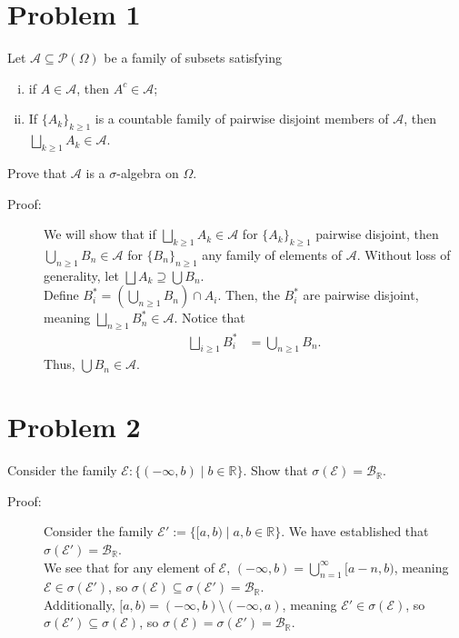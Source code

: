 \documentclass[10pt]{extarticle}
\title{}
\author{}
\date{}
\newcommand{\R}{\mathbb{R}}
\begin{document}
  \section{Problem 1}%
  Let $\mathcal{A}\subseteq \mathcal{P}(\Omega)$ be a family of subsets satisfying
  \begin{enumerate}[(i)]
    \item if $A\in \mathcal{A}$, then $A^{c}\in \mathcal{A}$;
    \item If $\{A_k\}_{k\geq 1}$ is a countable family of pairwise disjoint members of $\mathcal{A}$, then $\bigsqcup_{k\geq 1}A_k \in \mathcal{A}$.
  \end{enumerate}
  Prove that $\mathcal{A}$ is a $\sigma$-algebra on $\Omega$.
  \begin{description}
    \item[Proof:] We will show that if $\bigsqcup_{k\geq 1}A_k\in \mathcal{A}$ for $\{A_k\}_{k\geq 1}$ pairwise disjoint, then $\bigcup_{n\geq 1}B_n\in \mathcal{A}$ for $\{B_n\}_{n\geq 1}$ any family of elements of $\mathcal{A}$. Without loss of generality, let $\bigsqcup A_k \supseteq \bigcup B_n$.\\

      Define $B^{\ast}_i = \left(\bigcup_{n\geq 1}B_n\right)\cap A_i$. Then, the $B^{\ast}_i$ are pairwise disjoint, meaning $\bigsqcup_{n\geq 1}B^{\ast}_n \in \mathcal{A}$. Notice that
      \begin{align*}
        \bigsqcup_{i\geq 1} B^{\ast}_i &= \bigcup_{n\geq 1} B_n.
      \end{align*}
      Thus, $\bigcup B_n\in \mathcal{A}$.
  \end{description}
  \section{Problem 2}%
  Consider the family $\mathcal{E}: \{(-\infty,b)\mid b\in\R\}$. Show that $\sigma(\mathcal{E}) = \mathcal{B}_{\R}$.
  \begin{description}
    \item[Proof:] Consider the family $\mathcal{E}' := \{[a,b)\mid a,b\in\R\}$. We have established that $\sigma(\mathcal{E}') = \mathcal{B}_{\R}$.\\

      We see that for any element of $\mathcal{E}$, $(-\infty,b) = \bigcup_{n=1}^{\infty}[a-n,b)$, meaning $\mathcal{E}\in \sigma(\mathcal{E}')$, so $\sigma\left(\mathcal{E}\right)\subseteq \sigma(\mathcal{E}') = \mathcal{B}_{\R}$.\\

      Additionally, $[a,b) = (-\infty,b)\setminus (-\infty,a)$, meaning $\mathcal{E}' \in \sigma(\mathcal{E})$, so $\sigma(\mathcal{E}')\subseteq \sigma(\mathcal{E})$, so $\sigma\left(\mathcal{E}\right) = \sigma(\mathcal{E}') = \mathcal{B}_{\R}$.
  \end{description}
\end{document}
